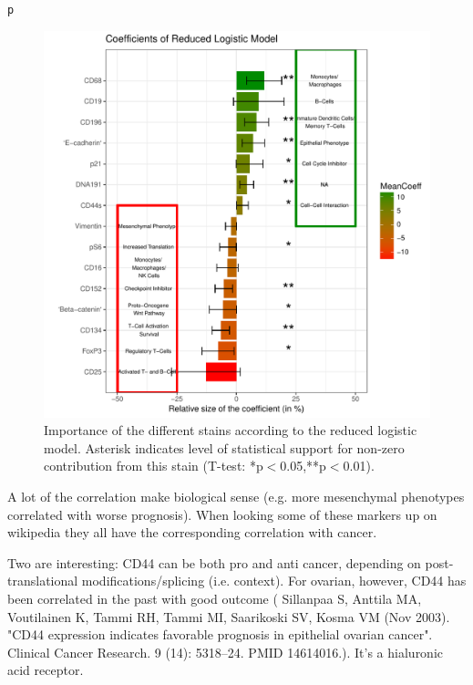 \documentclass[a4paper]{article}\usepackage[]{graphicx}\usepackage[]{color}
\makeatletter
\def\maxwidth{ %
  \ifdim\Gin@nat@width>\linewidth
    \linewidth
  \else
    \Gin@nat@width
  \fi
}
\newcommand{\hlstd}[1]{\textcolor[rgb]{0.345,0.345,0.345}{#1}}%
\newenvironment{kframe}{%
 \def\at@end@of@kframe{}%
 \ifinner\ifhmode%
  \def\at@end@of@kframe{\end{minipage}}%
  \begin{minipage}{\columnwidth}%
 \fi\fi%
 \def\FrameCommand##1{\hskip\@totalleftmargin \hskip-\fboxsep
 \colorbox{shadecolor}{##1}\hskip-\fboxsep
     \hskip-\linewidth \hskip-\@totalleftmargin \hskip\columnwidth}%
 \MakeFramed {\advance\hsize-\width
   \@totalleftmargin\z@ \linewidth\hsize
   \@setminipage}}%
 {\par\unskip\endMakeFramed%
 \at@end@of@kframe}
\newenvironment{knitrout}{}{} %
\makeatother
\begin{document}
\begin{knitrout}
\begin{kframe}
\begin{alltt}
\hlstd{p}
\end{alltt}
\end{kframe}\begin{figure}[h]
\includegraphics[width=\maxwidth]{figure/Fig_minModCoeff_Annot-1} \caption[Importance of the different stains according to the reduced logistic model]{Importance of the different stains according to the reduced logistic model. Asterisk indicates level of statistical support for non-zero contribution from this stain (T-test: *p$<$0.05,**p$<$0.01).}\label{fig:Fig_minModCoeff_Annot}
\end{figure}


\end{knitrout}

A lot of the correlation make biological sense (e.g. more mesenchymal phenotypes correlated with worse prognosis). When looking some of these markers up on wikipedia they all have the corresponding correlation with cancer.

Two are interesting:
CD44 can be both pro and anti cancer, depending on post-translational modifications/splicing (i.e. context). For ovarian, however, CD44 has been correlated in the past with good outcome ( Sillanpaa S, Anttila MA, Voutilainen K, Tammi RH, Tammi MI, Saarikoski SV, Kosma VM (Nov 2003). "CD44 expression indicates favorable prognosis in epithelial ovarian cancer". Clinical Cancer Research. 9 (14): 5318–24. PMID 14614016.). It's a hialuronic acid receptor.
\end{document}
